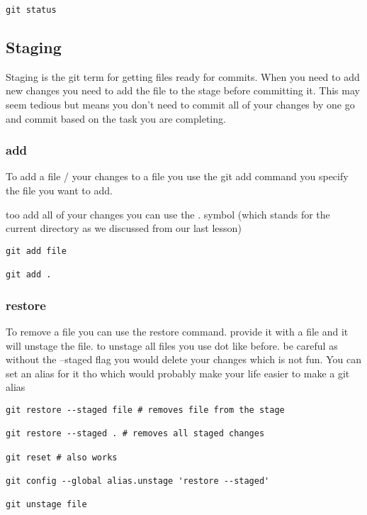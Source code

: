 \documentclass[a4paper]{article}
\begin{document}
\begin{verbatim}
git status
\end{verbatim}

\subsection*{Staging}
\label{sec:org7fc1ef0}
\begin{notes}
Staging is the git term for getting files ready for commits. When you need to
add new changes you need to add the file to the stage before committing it. This
may seem tedious but means you don't need to commit all of your changes by one go
and commit based on the task you are completing.
\end{notes}
\subsubsection*{add}
\label{sec:org703effe}
\begin{notes}
To add a file / your changes to a file you use the git add command you specify
the file you want to add.

too add all of your changes you can use the . symbol (which stands for the
current directory as we discussed from our last lesson)
\end{notes}
\begin{verbatim}
git add file

git add .
\end{verbatim}

\subsubsection*{restore}
\label{sec:org9399b84}
\begin{notes}
To remove a file you can use the restore command. provide it with a file and it
will unstage the file. to unstage all files you use dot like before. be careful
as without the --staged flag you would delete your changes which is not fun. You
can set an alias for it tho which would probably make your life easier to make a
git alias
\end{notes}

\begin{verbatim}
git restore --staged file # removes file from the stage

git restore --staged . # removes all staged changes

git reset # also works

git config --global alias.unstage 'restore --staged'

git unstage file
\end{verbatim}
\end{document}
